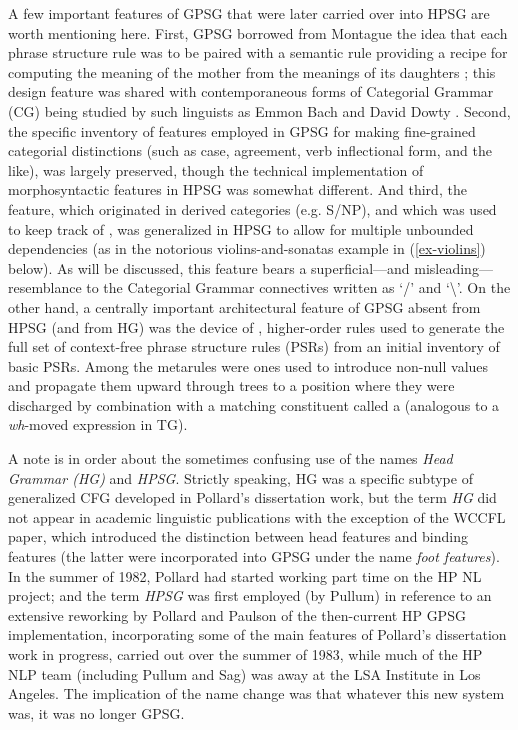\documentclass[output=paper
                ,modfonts
                ,nonflat
	        ,collection
	        ,collectionchapter
	        ,collectiontoclongg
 	        ,biblatex
                ,babelshorthands
                ,newtxmath
                ,draftmode
                ,colorlinks, citecolor=brown
]{./langsci/langscibook}
\begin{document}
A few important features of GPSG that were later carried over into HPSG are worth mentioning here. First, GPSG borrowed from Montague the idea that each phrase structure rule was to be paired with a semantic rule providing a recipe for computing the meaning of the mother from the meanings of its daughters \citep[]{Gazdar81a}; this design feature was shared with contemporaneous forms of Categorial Grammar (CG) being studied by such linguists as Emmon Bach \citep{Bach79a,Bach80a} and David Dowty \citep{Dowty82a-u,Dowty82b}.  Second, the specific inventory of features employed in GPSG for making fine-grained categorial distinctions (such as case, agreement, verb inflectional form, and the like), was largely preserved, though the technical implementation of morphosyntactic features in HPSG was somewhat different. And third, the \slasch feature, which originated in  derived categories (e.g. S/NP), and which was used to keep track of , was generalized in HPSG to allow for multiple unbounded dependencies (as in the notorious violins-and-sonatas example in (\ref{ex-violins}) below). As will be discussed, this \slasch feature bears a superficial---and misleading---resemblance to the Categorial Grammar connectives written as `/' and `\textbackslash'. On the other hand, a centrally important architectural feature of GPSG absent from HPSG (and from HG) was the device of , higher-order rules used to generate the full set of context-free phrase structure rules (PSRs) from an initial inventory of basic PSRs. Among the metarules were ones used to introduce non-null \slasch values and propagate them upward through trees to a position where they were discharged by combination with a matching constituent called a  (analogous to a \emph{wh}-moved expression in TG).

A note is in order about the sometimes confusing use of the names \emph{Head Grammar (HG)} and \emph{HPSG}. Strictly speaking, HG was a specific subtype of generalized CFG developed in Pollard's dissertation work, but the term \emph{HG} did not appear in academic linguistic publications with the exception of the \citet{PollardSag1983} WCCFL paper, which introduced the distinction between head features and binding features (the latter were incorporated into GPSG under the name \emph{foot features}). In the summer of 1982, Pollard had started working part time on the HP NL project; and the term \emph{HPSG} was first employed (by Pullum) in reference to an extensive reworking by Pollard and Paulson of the then-current HP GPSG implementation, incorporating some of the main features of Pollard's dissertation work in progress, carried out over the summer of 1983, while much of the HP NLP team (including Pullum and Sag) was away at the LSA Institute in Los Angeles.  The implication of the name change was that whatever this new system was, it was no longer GPSG.
\end{document}
